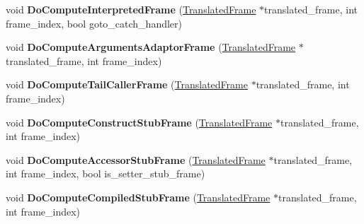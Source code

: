 \begin{DoxyCompactItemize}
\item 
void {\bfseries Do\+Compute\+Interpreted\+Frame} (\hyperlink{classv8_1_1internal_1_1_translated_frame}{Translated\+Frame} $\ast$translated\+\_\+frame, int frame\+\_\+index, bool goto\+\_\+catch\+\_\+handler)\hypertarget{classv8_1_1internal_1_1_deoptimizer_acdb5ad3ab3c413cf20643c93b0007def}{}\label{classv8_1_1internal_1_1_deoptimizer_acdb5ad3ab3c413cf20643c93b0007def}

\item 
void {\bfseries Do\+Compute\+Arguments\+Adaptor\+Frame} (\hyperlink{classv8_1_1internal_1_1_translated_frame}{Translated\+Frame} $\ast$translated\+\_\+frame, int frame\+\_\+index)\hypertarget{classv8_1_1internal_1_1_deoptimizer_adc575f8a05cbdcb687493f3e82704dc7}{}\label{classv8_1_1internal_1_1_deoptimizer_adc575f8a05cbdcb687493f3e82704dc7}

\item 
void {\bfseries Do\+Compute\+Tail\+Caller\+Frame} (\hyperlink{classv8_1_1internal_1_1_translated_frame}{Translated\+Frame} $\ast$translated\+\_\+frame, int frame\+\_\+index)\hypertarget{classv8_1_1internal_1_1_deoptimizer_a261d386e396989d6423c9eea80887363}{}\label{classv8_1_1internal_1_1_deoptimizer_a261d386e396989d6423c9eea80887363}

\item 
void {\bfseries Do\+Compute\+Construct\+Stub\+Frame} (\hyperlink{classv8_1_1internal_1_1_translated_frame}{Translated\+Frame} $\ast$translated\+\_\+frame, int frame\+\_\+index)\hypertarget{classv8_1_1internal_1_1_deoptimizer_a98f5c38de5095eec9d1175e95696c564}{}\label{classv8_1_1internal_1_1_deoptimizer_a98f5c38de5095eec9d1175e95696c564}

\item 
void {\bfseries Do\+Compute\+Accessor\+Stub\+Frame} (\hyperlink{classv8_1_1internal_1_1_translated_frame}{Translated\+Frame} $\ast$translated\+\_\+frame, int frame\+\_\+index, bool is\+\_\+setter\+\_\+stub\+\_\+frame)\hypertarget{classv8_1_1internal_1_1_deoptimizer_aeb8362419db5f42d07aeec6ba86ad612}{}\label{classv8_1_1internal_1_1_deoptimizer_aeb8362419db5f42d07aeec6ba86ad612}

\item 
void {\bfseries Do\+Compute\+Compiled\+Stub\+Frame} (\hyperlink{classv8_1_1internal_1_1_translated_frame}{Translated\+Frame} $\ast$translated\+\_\+frame, int frame\+\_\+index)\hypertarget{classv8_1_1internal_1_1_deoptimizer_a0d0f9b0836ffdad94c371b68b5f31300}{}\label{classv8_1_1internal_1_1_deoptimizer_a0d0f9b0836ffdad94c371b68b5f31300}


\end{DoxyCompactItemize}

